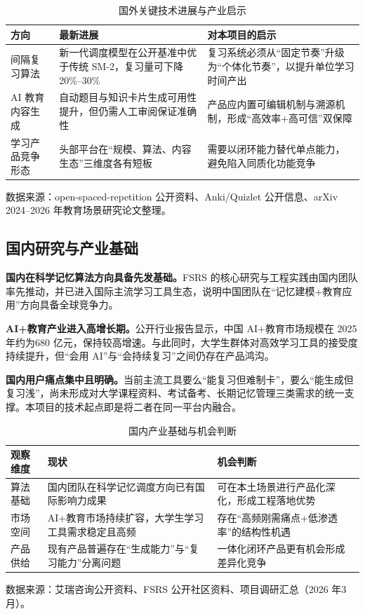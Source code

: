\begin{table}[htbp]
	\centering
	\caption{国外关键技术进展与产业启示}
	\label{tab:chap3_global_progress}
	\begin{tabular}{p{3.2cm}p{4.8cm}p{5.6cm}}
		\toprule
		\textbf{方向} & \textbf{最新进展} & \textbf{对本项目的启示} \\
		\midrule
		间隔复习算法 & 新一代调度模型在公开基准中优于传统 SM-2，复习量可下降20\%--30\% & 复习系统必须从“固定节奏”升级为“个体化节奏”，以提升单位学习时间产出 \\
		AI 教育内容生成 & 自动题目与知识卡片生成可用性提升，但仍需人工审阅保证准确性 & 产品应内置可编辑机制与溯源机制，形成“高效率+高可信”双保障 \\
		学习产品竞争形态 & 头部平台在“规模、算法、内容生态”三维度各有短板 & 需要以闭环能力替代单点能力，避免陷入同质化功能竞争 \\
		\bottomrule
	\end{tabular}
	\begin{flushleft}
		\footnotesize 数据来源：open-spaced-repetition 公开资料、Anki/Quizlet 公开信息、arXiv 2024--2026 年教育场景研究论文整理。
	\end{flushleft}
\end{table}

\subsection{国内研究与产业基础}

\textbf{国内在科学记忆算法方向具备先发基础。}FSRS 的核心研究与工程实践由国内团队率先推动，并已进入国际主流学习工具生态，说明中国团队在“记忆建模+教育应用”方向具备全球竞争力。

\textbf{AI+教育产业进入高增长期。}公开行业报告显示，中国 AI+教育市场规模在 2025 年约为680 亿元，保持较高增速。与此同时，大学生群体对高效学习工具的接受度持续提升，但“会用 AI”与“会持续复习”之间仍存在产品鸿沟。

\textbf{国内用户痛点集中且明确。}当前主流工具要么“能复习但难制卡”，要么“能生成但复习浅”，尚未形成对大学课程资料、考试备考、长期记忆管理三类需求的统一支撑。本项目的技术起点即是将二者在同一平台内融合。

\begin{table}[htbp]
	\centering
	\caption{国内产业基础与机会判断}
	\label{tab:chap3_china_basis}
	\begin{tabular}{p{3.5cm}p{4.2cm}p{5.9cm}}
		\toprule
		\textbf{观察维度} & \textbf{现状} & \textbf{机会判断} \\
		\midrule
		算法基础 & 国内团队在科学记忆调度方向已有国际影响力成果 & 可在本土场景进行产品化深化，形成工程落地优势 \\
		市场空间 & AI+教育市场持续扩容，大学生学习工具需求稳定且高频 & 存在“高频刚需痛点+低渗透率”的结构性机遇 \\
		产品供给 & 现有产品普遍存在“生成能力”与“复习能力”分离问题 & 一体化闭环产品更有机会形成差异化竞争 \\
		\bottomrule
	\end{tabular}
	\begin{flushleft}
		\footnotesize 数据来源：艾瑞咨询公开资料、FSRS 公开社区资料、项目调研汇总（2026 年3 月）。
	\end{flushleft}
\end{table}

